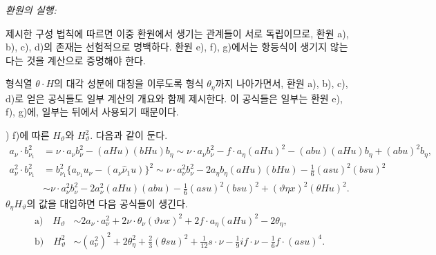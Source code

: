 
\noindent\emph{환원의 실행:}

제시한 구성 법칙에 따르면 이중 환원에서 생기는 관계들이 서로 독립이므로, 환원 a), b), c), d)의 존재는 선험적으로 명백하다. 환원 e), f), g)에서는 항등식이 생기지 않는다는 것을 계산으로 증명해야 한다.

형식열 $\theta\cdot H$의 대각 성분에 대칭을 이루도록 형식 $\theta_\eta$까지 나아가면서, 환원 a), b), c), d)로 얻은 공식들도 일부 계산의 개요와 함께 제시한다. 이 공식들은 일부는 환원 e), f), g)에, 일부는 뒤에서 사용되기 때문이다.

) f)에 따른 $H_\vartheta$와 $H_\vartheta^2$. 다음과 같이 둔다.
\[
\begin{aligned}
a_\nu\cdot b_{\nu_1}^2
&=\nu\cdot a_\nu b_\nu^2-(aHu)(bHu)b_\eta
\sim \nu\cdot a_\nu b_\nu^2-f\cdot a_\eta(aHu)^2-(abu)(aHu)b_\eta+(abu)^2b_\eta,\\
a_\nu^2\cdot b_{\nu_1}^2
&=b_{\nu_1}^2\{a_{\nu_1}u_\nu-(a_\nu\widehat{\nu}_1u)\}^2
\sim \nu\cdot a_\nu^2b_\nu^2-2a_\eta b_\eta(aHu)(bHu)-\frac16(asu)^2(bsu)^2\\
&\sim \nu\cdot a_\nu^2b_\nu^2-2a_\nu^2(aHu)(abu)-\frac16(asu)^2(bsu)^2+(\vartheta\eta x)^2(\theta Hu)^2.
\end{aligned}
\]
$\theta_\eta H_\vartheta$의 값을 대입하면 다음 공식들이 생긴다.
\[
\tag{12}
\begin{aligned}
\text{a)}\quad H_\vartheta&\sim 2a_\nu\cdot a_\nu^2+2\nu\cdot\theta_\nu(\vartheta\nu x)^2+2f\cdot a_\eta(aHu)^2-2\theta_\eta,\\
\text{b)}\quad H_\vartheta^2&\sim (a_\nu^2)^2+2\theta_\eta^2+\frac23(\theta su)^2+\frac1{12}s\cdot\nu-\frac19 i f\cdot\nu-\frac16f\cdot(asu)^4.
\end{aligned}
\]
